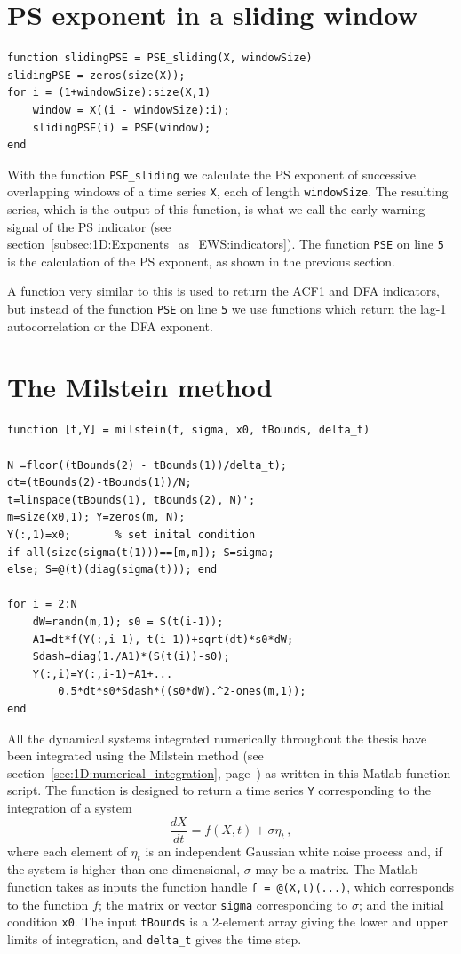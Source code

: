 \section{PS exponent in a sliding window}
\label{appendix:PSsliding}
\begin{lstlisting}
function slidingPSE = PSE_sliding(X, windowSize)
slidingPSE = zeros(size(X));
for i = (1+windowSize):size(X,1)
	window = X((i - windowSize):i);
	slidingPSE(i) = PSE(window);
end
\end{lstlisting}
With the function \texttt{PSE\_sliding} we calculate the PS exponent of successive overlapping windows of a time series \texttt{X}, each of length \texttt{windowSize}. The resulting series, which is the output of this function, is what we call the early warning signal of the PS indicator (see section~\ref{subsec:1D:Exponents_as_EWS:indicators}). The function \texttt{PSE} on line \texttt{5} is the calculation of the PS exponent, as shown in the previous section. 

A function very similar to this is used to return the ACF1 and DFA indicators, but instead of the function \texttt{PSE} on line \texttt{5} we use functions which return the lag-1 autocorrelation or the DFA exponent. 

\section{The Milstein method}
\label{appendix:milstein}
\begin{lstlisting}
function [t,Y] = milstein(f, sigma, x0, tBounds, delta_t)

N =floor((tBounds(2) - tBounds(1))/delta_t);
dt=(tBounds(2)-tBounds(1))/N;
t=linspace(tBounds(1), tBounds(2), N)'; 
m=size(x0,1); Y=zeros(m, N);  
Y(:,1)=x0;       % set inital condition
if all(size(sigma(t(1)))==[m,m]); S=sigma; 
else; S=@(t)(diag(sigma(t))); end

for i = 2:N
	dW=randn(m,1); s0 = S(t(i-1));
	A1=dt*f(Y(:,i-1), t(i-1))+sqrt(dt)*s0*dW;
	Sdash=diag(1./A1)*(S(t(i))-s0);
	Y(:,i)=Y(:,i-1)+A1+...
		0.5*dt*s0*Sdash*((s0*dW).^2-ones(m,1));
end
\end{lstlisting}
All the dynamical systems integrated numerically throughout the thesis have been integrated using the Milstein method (see section~\ref{sec:1D:numerical_integration}, page~\pageref{sec:1D:numerical_integration}) as written in this Matlab function script. The function is designed to return a time series \texttt{Y} corresponding to the integration of a system
\begin{equation}
\frac{dX}{dt} = f(X,t) + \sigma\eta_t\,,
\end{equation}
where each element of $\eta_t$ is an independent Gaussian white noise process and, if the system is higher than one-dimensional, $\sigma$ may be a matrix. The Matlab function takes as inputs the function handle \texttt{f = @(X,t)(...)}, which corresponds to the function $f$; the matrix or vector \texttt{sigma} corresponding to $\sigma$; and the initial condition \texttt{x0}. The input \texttt{tBounds} is a 2-element array giving the lower and upper limits of integration, and \texttt{delta\_t} gives the time step.